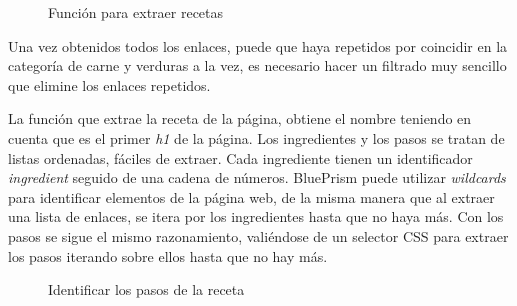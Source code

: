 \begin{figure}[H]
    \centering
    \caption{Función para extraer recetas}
    \label{fig:recipe}
\end{figure}

Una vez obtenidos todos los enlaces, puede que haya repetidos por coincidir en la categoría de carne y verduras a la vez, es necesario hacer un filtrado muy sencillo que elimine los enlaces repetidos. 

La función que extrae la receta de la página, obtiene el nombre teniendo en cuenta que es el primer \emph{h1} de la página. Los ingredientes y los pasos se tratan de listas ordenadas, fáciles de extraer. Cada ingrediente tienen un identificador \emph{ingredient} seguido de una cadena de números. BluePrism puede utilizar \emph{wildcards} para identificar elementos de la página web, de la misma manera que al extraer una lista de enlaces, se itera por los ingredientes hasta que no haya más. Con los pasos se sigue el mismo razonamiento, valiéndose de un selector \gls{CSS} para extraer los pasos iterando sobre ellos hasta que no hay más. 

\begin{figure}[H]
    \centering
    \caption{Identificar los pasos de la receta}
    \label{fig:steps}
\end{figure}


